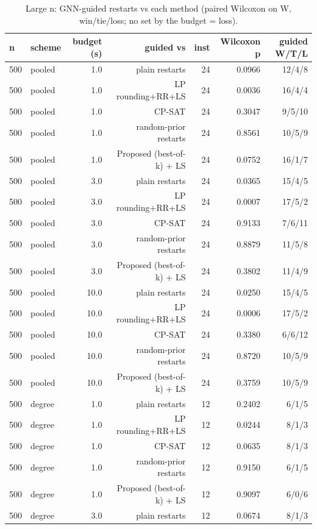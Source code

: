 \begin{table}[t]
\centering
\caption{Large n: GNN-guided restarts vs each method (paired Wilcoxon on W, win/tie/loss; no set by the budget = loss).}
\label{tab:rev2_step2_tests}
\scriptsize
\begin{tabular}{llrrrrr}
\toprule
n & scheme & budget (s) & guided vs & inst & Wilcoxon p & guided W/T/L \\
\midrule
500 & pooled & 1.0 & plain restarts & 24 & 0.0966 & 12/4/8 \\
500 & pooled & 1.0 & LP rounding+RR+LS & 24 & 0.0036 & 16/4/4 \\
500 & pooled & 1.0 & CP-SAT & 24 & 0.3047 & 9/5/10 \\
500 & pooled & 1.0 & random-prior restarts & 24 & 0.8561 & 10/5/9 \\
500 & pooled & 1.0 & Proposed (best-of-k) + LS & 24 & 0.0752 & 16/1/7 \\
500 & pooled & 3.0 & plain restarts & 24 & 0.0365 & 15/4/5 \\
500 & pooled & 3.0 & LP rounding+RR+LS & 24 & 0.0007 & 17/5/2 \\
500 & pooled & 3.0 & CP-SAT & 24 & 0.9133 & 7/6/11 \\
500 & pooled & 3.0 & random-prior restarts & 24 & 0.8879 & 11/5/8 \\
500 & pooled & 3.0 & Proposed (best-of-k) + LS & 24 & 0.3802 & 11/4/9 \\
500 & pooled & 10.0 & plain restarts & 24 & 0.0250 & 15/4/5 \\
500 & pooled & 10.0 & LP rounding+RR+LS & 24 & 0.0006 & 17/5/2 \\
500 & pooled & 10.0 & CP-SAT & 24 & 0.3380 & 6/6/12 \\
500 & pooled & 10.0 & random-prior restarts & 24 & 0.8720 & 10/5/9 \\
500 & pooled & 10.0 & Proposed (best-of-k) + LS & 24 & 0.3759 & 10/5/9 \\
500 & degree & 1.0 & plain restarts & 12 & 0.2402 & 6/1/5 \\
500 & degree & 1.0 & LP rounding+RR+LS & 12 & 0.0244 & 8/1/3 \\
500 & degree & 1.0 & CP-SAT & 12 & 0.0635 & 8/1/3 \\
500 & degree & 1.0 & random-prior restarts & 12 & 0.9150 & 6/1/5 \\
500 & degree & 1.0 & Proposed (best-of-k) + LS & 12 & 0.9097 & 6/0/6 \\
500 & degree & 3.0 & plain restarts & 12 & 0.0674 & 8/1/3 \\

\end{tabular}
\end{table}
